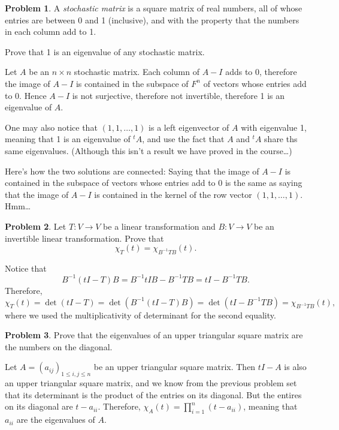 \documentclass[11pt,oneside]{amsart}
\theoremstyle{definition}
\newtheorem{problem}{Problem}
\begin{document}
    \begin{problem}
        A \emph{stochastic matrix} is a square matrix of real numbers, all of whose entries are between 0 and 1 (inclusive), and with the property that the numbers in each column add to 1.

        Prove that 1 is an eigenvalue of any stochastic matrix.
    \end{problem}
    \begin{solution}
        Let $A$ be an $n\times n$ stochastic matrix. Each column of $A-I$ adds to 0, therefore the image of $A-I$ is contained in the subspace of $F^n$ of vectors whose entries add to 0. Hence $A-I$ is not surjective, therefore not invertible, therefore 1 is an eigenvalue of $A$.

        One may also notice that $(1,1,\dots,1)$ is a left eigenvector of $A$ with eigenvalue 1, meaning that 1 is an eigenvalue of $^tA$, and use the fact that $A$ and $^tA$ share ths same eigenvalues. (Although this isn't a result we have proved in the course\dots)

        Here's how the two solutions are connected: Saying that the image of $A-I$ is contained in the subspace of vectors whose entries add to 0 is the same as saying that the image of $A-I$ is contained in the kernel of the row vector $(1,1,\dots,1)$. Hmm\dots
    \end{solution}
    
    \begin{problem}
        Let $T\colon V\to V$ be a linear transformation and $B\colon V\to V$ be an invertible linear transformation. Prove that
        \[\chi_T(t)=\chi_{B^{-1}TB}(t). \]
    \end{problem}
    \begin{solution}
        Notice that
        \[B^{-1}(tI-T)B=B^{-1}tIB-B^{-1}TB=tI-B^{-1}TB.\]
        Therefore,
        \[\chi_T(t)=\det(tI-T)=\det(B^{-1}(tI-T)B)=\det(tI-B^{-1}TB)=\chi_{B^{-1}TB}(t),\]
        where we used the multiplicativity of determinant for the second equality.
    \end{solution}

    \begin{problem}
        Prove that the eigenvalues of an upper triangular square matrix are the numbers on the diagonal.
    \end{problem}
    \begin{solution}
        Let $A=(a_{ij})_{1\leq i,j\leq n}$ be an upper triangular square matrix. Then $tI-A$ is also an upper triangular square matrix, and we know from the previous problem set that its determinant is the product of the entries on its diagonal. But the entires on its diagonal are $t-a_{ii}$. Therefore, $\chi_A(t)=\prod_{i=1}^n (t-a_{ii})$, meaning that $a_{ii}$ are the eigenvalues of $A$.
    \end{solution}
\end{document}
